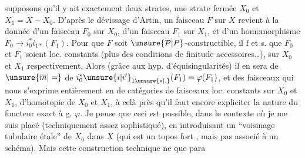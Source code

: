 supposons qu'il y ait exactement deux strates, une strate fermée $X_0$ et $X_1=X-X_0$. D'après le dévissage d'Artin, un faisceau $F$ sur $X$ revient à la donnée d'un faisceau $F_0$  sur $X_0$, d'un faisceau $F_1$  sur $X_1$, et d'un homomorphisme $F_0\longrightarrow i_0^*i_{1*}(F_1)$. Pour que $F$
%
soit $\unsure{\mathcal P|P}$-constructible, il f et s. que $F_0$ et $F_1$ soient loc. constants (plus des conditions de finitude accessoires\ldots), sur $X_0$ et $X_1$ respectivement. Alors (grâce aux hyp. d'équisingularités) il en sera de $\unsure{\overline m|=}$ de $i_0^*\unsure{i|i'}_{1\unsure{*|,}}(F_1)=\varphi(F_1)$, et  des faisceaux qui nous  s'exprime entièrement en   de catégories de faisceaux loc. constants sur $X_0$ et $X_1$,   d'homotopie de $X_0$ et $X_1$, à celà près qu'il faut encore expliciter la nature du foncteur exact à g. $\varphi$. Je pense que ceci est possible, dans le contexte  où je me suis placé (techniquement assez sophistiqué), en introduisant un ``voisinage tubulaire étale'' de $X_0$ dans $X$ (qui est un topos fort , mais pas associé à un schéma). Mais cette construction technique ne  que para%
